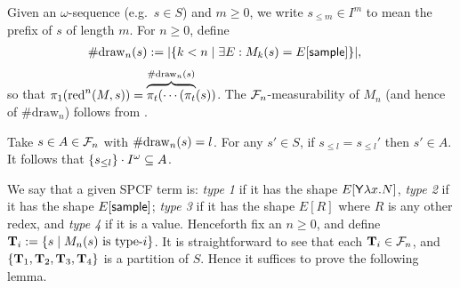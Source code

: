 Given an $\omega$-sequence (e.g.~$s \in S$) and $m \geq 0$, we write $s_{\leq m} \in I^m$ to mean the prefix of $s$ of length $m$.
For $n \geq 0$, define
\begin{align*}
\#\mathrm{draw}_{n}(s) &:= |\{k < n \mid \exists E: M_k(s) = E[\mathsf{sample}]\}|,
\end{align*}
so that $\pi_1 (\operatorname{red}^n(M, s)) = \overbrace{\pi_t( \cdots (\pi_t}^{\#\mathrm{draw}_{n}(s)}(s))$. 
The $\mathcal{F}_n$-measurability of $M_n$ (and hence of $\#\mathrm{draw}_n$) follows from \citep{DBLP:conf/icfp/BorgstromLGS16}.
\iffalse
\akr{$\#\mathrm{draw}_n$ is not a stopping time. It doesn't look like you actually use this claim anyway, so it should just be fine to remove, but did you mean something different?} \lo{I agree, and I don't actually use this claim.}
\fi
Take $s \in A \in \mathcal{F}_n$ with $\#\mathrm{draw}_{n}(s) = l$.
For any $s'\in S$, if $s_{\leq l} = s_{\leq l}'$ then $s' \in A$.
It follows that ${\{s_{\leq l}\} \cdot I^\omega} \subseteq A$.

\iffalse
\lo{We need to show that each $f(M_n)$ is integrable. LO claimed earlier that $0 \leq f(N) \leq f(M)$ for all $N \in \mathit{Rch}(M)$.
This is of false: take $f$ with $v \, \tsample \mapsto 1$ and $v \, \underline{r} \mapsto 2\, r$ for some value $v$. 
However, it is true that
\[
\int_{S} \mu(\dif s) \, |f(M_n)(s)| 
=
\int_{S} \mu(\dif s) \, f(M_n)(s)
\leq
\int_{S} \mu(\dif s) \, f(M_0)(s)
=
f(M)
\]
the inequality above follows from \Cref{lem:key rankable}.
}
\fi

We say that a given SPCF term is: %
\emph{type 1} if it has the shape $E[\mathsf{Y} \lambda x. N]$, \emph{type 2} if it has the shape $E[\mathsf{sample}]$; \emph{type 3} if it has the shape $E[R]$ where $R$ is any other redex, and \emph{type 4} if it is a value.
Henceforth fix an $n \geq 0$, and define $\mathbf{T}_i := \{s \mid M_n(s) \hbox{ is type-$i$}\}$.
It is straightforward to see that each $\mathbf{T}_i \in \mathcal{F}_n$, and $\{\mathbf{T}_1, \mathbf{T}_2, \mathbf{T}_3, \mathbf{T}_4\}$ is a partition of $S$.
Hence it suffices to prove the following lemma.

